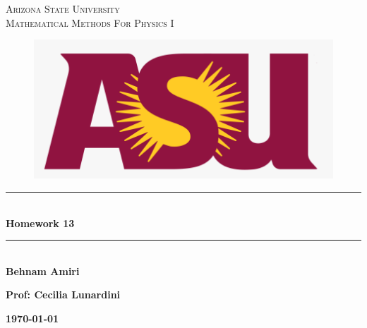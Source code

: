 \documentclass[fleqn]{article}
\begin{document}
  \begin{titlepage}

    \newcommand{\HRule}{\rule{\linewidth}{0.5mm}} %

    \center %



    \textsc{\LARGE Arizona State University}\\[1.5cm] %

    \textsc{\LARGE Mathematical Methods For Physics I }\\[1.5cm] %


    \begin{figure}
      \includegraphics[width=\linewidth]{asu.png}
    \end{figure}


    \HRule \\[0.4cm]
    { \huge \bfseries Homework 13}\\[0.4cm] 
    \HRule \\[1.5cm]

    \textbf{Behnam Amiri}

    \bigbreak

    \textbf{Prof: Cecilia Lunardini}

    \bigbreak


    \textbf{{\large \today}\\[2cm]}

    \vfill %

  \end{titlepage}
\end{document}
